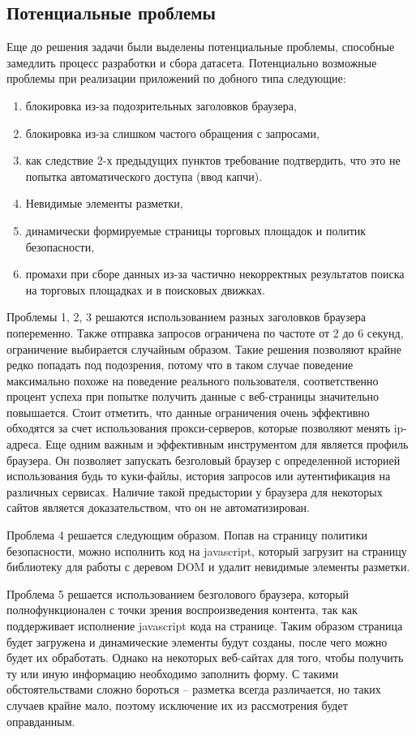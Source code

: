 \documentclass[../main]{subfiles}
\begin{document}
\subsection{Потенциальные проблемы}
Еще до решения задачи были выделены потенциальные проблемы, способные замедлить процесс разработки и сбора датасета. Потенциально возможные проблемы при реализации приложений по добного типа следующие:
\begin{enumerate}
    \item блокировка из-за подозрительных заголовков браузера,
    \item блокировка из-за слишком частого обращения с запросами,
    \item как следствие 2-х предыдущих пунктов требование подтвердить, что это не попытка автоматического доступа (ввод капчи).
    \item Невидимые элементы разметки,
    \item динамически формируемые страницы торговых площадок и политик безопасности,
    \item промахи при сборе данных из-за частично некорректных результатов поиска на торговых площадках и в поисковых движках.
\end{enumerate}

Проблемы 1, 2, 3 решаются использованием разных заголовков браузера попеременно. Также отправка запросов ограничена по частоте от 2 до 6 секунд, ограничение выбирается случайным образом. Такие решения позволяют крайне редко попадать под подозрения, потому что в таком случае поведение максимально похоже на поведение реального пользователя, соответственно процент успеха при попытке получить данные с веб-страницы значительно повышается. Стоит отметить, что данные ограничения очень эффективно обходятся за счет использования прокси-серверов, которые позволяют менять ip-адреса. Еще одним важным и эффективным инструментом для является профиль браузера. Он позволяет запускать безголовый браузер с определенной историей использования будь то куки-файлы, история запросов или аутентификация на различных сервисах. Наличие такой предыстории у браузера для некоторых сайтов является доказательством, что он не автоматизирован.

Проблема 4 решается следующим образом. Попав на страницу политики безопасности, можно исполнить код на javascript, который загрузит на страницу библиотеку для работы с деревом DOM и удалит невидимые элементы разметки.

Проблема 5 решается использованием безголового браузера, который полнофункционален с точки зрения воспроизведения контента, так как поддерживает исполнение javascript кода на странице. Таким образом страница будет загружена и динамические элементы будут созданы, после чего можно будет их обработать. Однако на некоторых веб-сайтах для того, чтобы получить ту или иную информацию необходимо заполнить форму. С такими обстоятельствами сложно бороться – разметка всегда различается, но таких случаев крайне мало, поэтому исключение их из рассмотрения будет оправданным.
\end{document}
